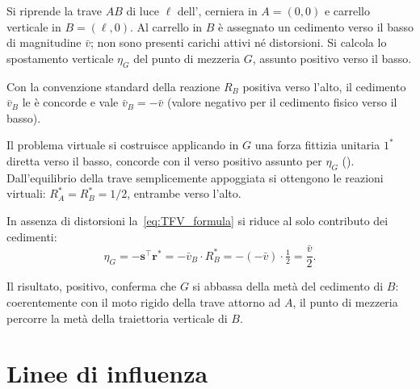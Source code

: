 \begin{esempio}
	\label{ex:TFV_cedimento}
	
	Si riprende la trave $AB$ di luce $\ell$ dell', cerniera in $A = (0,0)$ e carrello verticale in $B = (\ell,0)$. Al carrello in $B$ è assegnato un cedimento verso il basso di magnitudine $\bar{v}$; non sono presenti carichi attivi né distorsioni. Si calcola lo spostamento verticale $\eta_G$ del punto di mezzeria $G$, assunto positivo verso il basso.
	
	Con la convenzione standard della reazione $R_B$ positiva verso l'alto, il cedimento $\bar{v}_B$ le è concorde e vale $\bar{v}_B = -\bar{v}$ (valore negativo per il cedimento fisico verso il basso).
	
	Il problema virtuale si costruisce applicando in $G$ una forza fittizia unitaria $1^*$ diretta verso il basso, concorde con il verso positivo assunto per $\eta_G$ (). Dall'equilibrio della trave semplicemente appoggiata si ottengono le reazioni virtuali: $R_A^* = R_B^* = 1/2$, entrambe verso l'alto.



	
	In assenza di distorsioni la~\eqref{eq:TFV_formula} si riduce al solo contributo dei cedimenti:
	\begin{equation*}
		\eta_G = -\bm{s}^\top\bm{r}^* = -\bar{v}_B \cdot R_B^*
		= -(-\bar{v}) \cdot \tfrac{1}{2} = \frac{\bar{v}}{2}.
	\end{equation*}
	
	Il risultato, positivo, conferma che $G$ si abbassa della metà del cedimento di $B$: coerentemente con il moto rigido della trave attorno ad $A$, il punto di mezzeria percorre la metà della traiettoria verticale di $B$.
	
\end{esempio}




\section{Linee di influenza}
\label{sec:linee_influenza}

